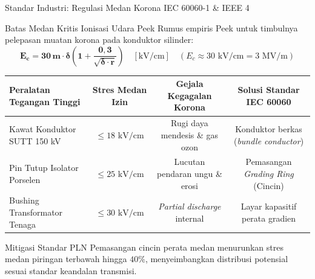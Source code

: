 \documentclass[aspectratio=169,10pt]{beamer}
\begin{document}
\begin{frame}{Standar Industri: Regulasi Medan Korona IEC 60060-1 \& IEEE 4}
  \begin{block}{Batas Medan Kritis Ionisasi Udara Peek}
    \small
    Rumus empiris Peek untuk timbulnya pelepasan muatan korona pada konduktor silinder:
    \begin{equation*}
      \mathbf{E_c = 30\, m \cdot \delta \left( 1 + \frac{0{,}3}{\sqrt{\delta \cdot r}} \right)} \quad [\text{kV/cm}] \quad (E_c \approx 30\text{ kV/cm} = 3\text{ MV/m})
    \end{equation*}
  \end{block}
  \vspace{0.05cm}
  \begin{table}[h]
    \centering
    \scriptsize
    \begin{tabular}{lccc}
      \toprule
      \textbf{Peralatan Tegangan Tinggi} & \textbf{Stres Medan Izin} & \textbf{Gejala Kegagalan Korona} & \textbf{Solusi Standar IEC 60060} \\
      \midrule
      Kawat Konduktor SUTT 150 kV & $\le 18\text{ kV/cm}$ & Rugi daya mendesis \& gas ozon & Konduktor berkas (\textit{bundle conductor}) \\
      Pin Tutup Isolator Porselen & $\le 25\text{ kV/cm}$ & Lucutan pendaran ungu \& erosi & Pemasangan \textit{Grading Ring} (Cincin) \\
      Bushing Transformator Tenaga & $\le 30\text{ kV/cm}$ & \textit{Partial discharge} internal & Layar kapasitif perata gradien \\
      \bottomrule
    \end{tabular}
  \end{table}
  \begin{alertblock}{Mitigasi Standar PLN}
    Pemasangan cincin perata medan menurunkan stres medan piringan terbawah hingga $40\%$, menyeimbangkan distribusi potensial sesuai standar keandalan transmisi.
  \end{alertblock}
\end{frame}
\end{document}

